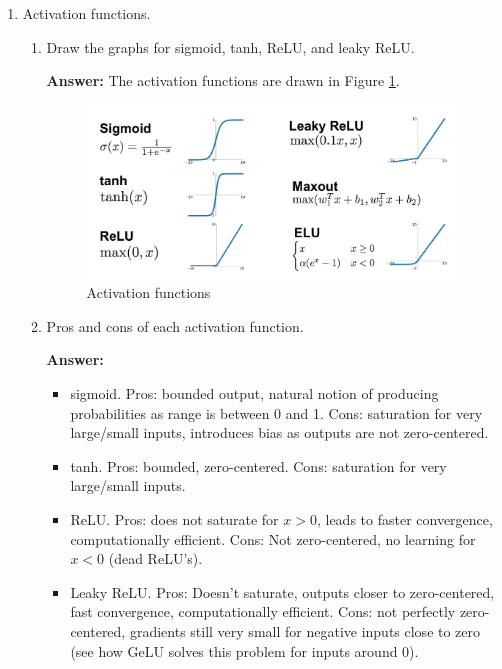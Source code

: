 \documentclass{article}
\newenvironment{QandA}{\begin{enumerate}[label=\arabic*.]}{\end{enumerate}}
\newenvironment{InnerQandA}{\begin{enumerate}[label=\roman*.]}{\end{enumerate}}
\newenvironment{answer}{\par\normalfont \textbf{Answer:}}{}
\begin{document}
\begin{QandA}
\begin{InnerQandA}
        \item Implement vanilla dropout for the forward and backward pass in NumPy.
        \begin{answer}
            The updated version of the gist with dropout can be found \href{https://gist.github.com/zaf-stojano/0cda51a7a1068d2936de3f1df2a47332}{here}. This time CoPilot needed a bit hand-holding, but is still very impressive.
        \end{answer}
    \end{InnerQandA}

    \item Activation functions.
    \begin{InnerQandA}
        \item Draw the graphs for sigmoid, tanh, ReLU, and leaky ReLU.
        \begin{answer}
            The activation functions are drawn in Figure \ref{fig:activation-functions}.
        \end{answer}
        \begin{figure}[h!]
                \centering
                \includegraphics[width=0.7\linewidth]{img/activation-functions.png}
                \caption{Activation functions}
                \label{fig:activation-functions}
            \end{figure}

        \item Pros and cons of each activation function.
        \begin{answer}
            \begin{itemize}
                \item sigmoid. Pros: bounded output, natural notion of producing probabilities as range is between 0 and 1. Cons: saturation for very large/small inputs, introduces bias as outputs are not zero-centered.
                \item tanh. Pros: bounded, zero-centered. Cons: saturation for very large/small inputs.
                \item ReLU. Pros: does not saturate for $x > 0$, leads to faster convergence, computationally efficient. Cons: Not zero-centered, no learning for $x < 0$ (dead ReLU's).
                \item Leaky ReLU. Pros: Doesn't saturate, outputs closer to zero-centered, fast convergence, computationally efficient. Cons: not perfectly zero-centered, gradients still very small for negative inputs close to zero (see how GeLU solves this problem for inputs around 0). 
            \end{itemize}
        \end{answer}


\end{InnerQandA}
\end{QandA}
\end{document}
